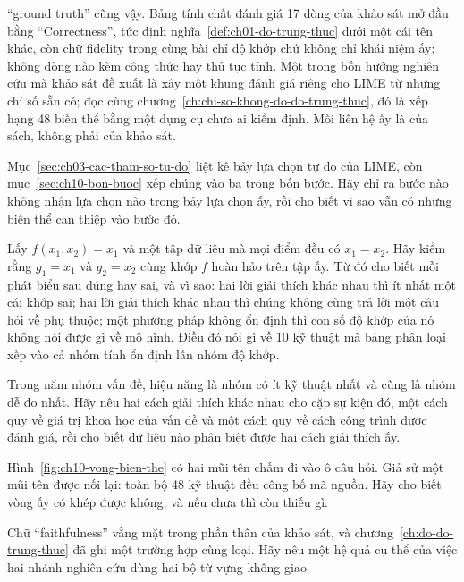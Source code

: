 \begin{tomtat}
\begin{itemize}
  \enquote{ground truth} cũng vậy. Bảng tính chất đánh giá 17 dòng của khảo sát mở
  đầu bằng \enquote{Correctness}, tức định nghĩa~\ref{def:ch01-do-trung-thuc} dưới
  một cái tên khác, còn chữ fidelity trong cùng bài chỉ độ khớp chứ không chỉ
  khái niệm ấy; không dòng nào kèm công thức hay thủ tục tính. Một trong bốn hướng nghiên cứu mà khảo sát đề xuất là xây
  một khung đánh giá riêng cho LIME từ những chỉ số sẵn có; đọc cùng
  chương~\ref{ch:chi-so-khong-do-do-trung-thuc}, đó là xếp hạng 48 biến thể bằng
  một dụng cụ chưa ai kiểm định. Mối liên hệ ấy là của sách, không phải của
  khảo sát.
\end{itemize}
\end{tomtat}

\cauhoi
\begin{cauhoids}
  \item Mục~\ref{sec:ch03-cac-tham-so-tu-do} liệt kê bảy lựa chọn tự do của
  LIME, còn mục~\ref{sec:ch10-bon-buoc} xếp chúng vào ba trong bốn bước. Hãy
  chỉ ra bước nào không nhận lựa chọn nào trong bảy lựa chọn ấy, rồi cho biết
  vì sao vẫn có những biến thể can thiệp vào bước đó.
  \item Lấy $f(x_1,x_2) = x_1$ và một tập dữ liệu mà mọi điểm đều có
  $x_1 = x_2$. Hãy kiểm rằng $g_1 = x_1$ và $g_2 = x_2$ cùng khớp $f$ hoàn hảo
  trên tập ấy. Từ đó cho biết mỗi phát biểu sau đúng hay sai, và vì sao: hai lời
  giải thích khác nhau thì ít nhất một cái khớp sai; hai lời giải thích khác
  nhau thì chúng không cùng trả lời một câu hỏi về phụ thuộc; một phương pháp
  không ổn định thì con số độ khớp của nó không nói được gì về mô hình. Điều đó
  nói gì về 10 kỹ thuật mà bảng phân loại xếp vào cả nhóm tính ổn định lẫn nhóm
  độ khớp.
  \item Trong năm nhóm vấn đề, hiệu năng là nhóm có ít kỹ thuật nhất và cũng là
  nhóm dễ đo nhất. Hãy nêu hai cách giải thích khác nhau cho cặp sự kiện đó, một
  cách quy về giá trị khoa học của vấn đề và một cách quy về cách công trình
  được đánh giá, rồi cho biết dữ liệu nào phân biệt được hai cách giải thích ấy.
  \item Hình~\ref{fig:ch10-vong-bien-the} có hai mũi tên chấm đi vào ô câu hỏi.
  Giả sử một mũi tên được nối lại: toàn bộ 48 kỹ thuật đều công bố mã nguồn. Hãy
  cho biết vòng ấy có khép được không, và nếu chưa thì còn thiếu gì.
  \item Chữ \enquote{faithfulness} vắng mặt trong phần thân của khảo sát, và
  chương~\ref{ch:do-do-trung-thuc} đã ghi một trường hợp cùng loại. Hãy nêu một
  hệ quả cụ thể của việc hai nhánh nghiên cứu dùng hai bộ từ vựng không giao

\end{cauhoids}
